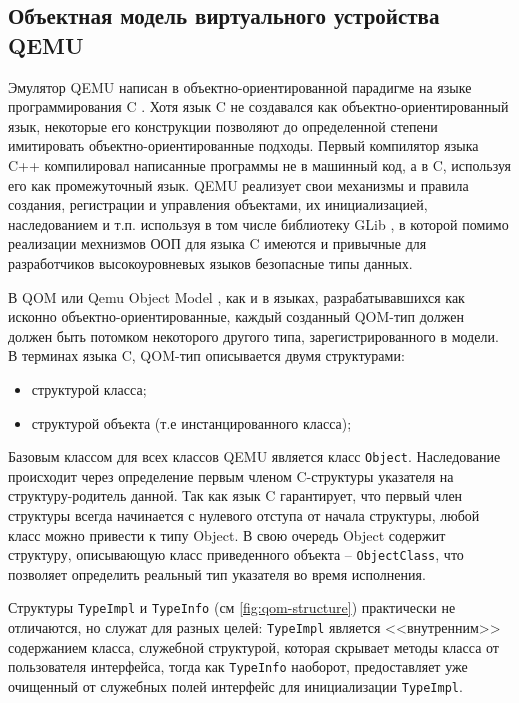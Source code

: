 \subsection{Объектная модель виртуального устройства QEMU}\label{sec:ch1/sec4/sub,/sub3}

Эмулятор QEMU написан в объектно-ориентированной парадигме на языке программирования C \cite{ooc}.
Хотя язык C не создавался как объектно-ориентированный язык, некоторые его конструкции позволяют
до определенной степени имитировать объектно-ориентированные подходы.
Первый компилятор языка C++ компилировал написанные программы не в машинный код, а в C, используя
его как промежуточный язык.
QEMU реализует свои механизмы и правила создания, регистрации и управления объектами, их инициализацией,
наследованием и т.п. используя в том числе библиотеку GLib \cite{glib}, в которой помимо реализации
мехнизмов ООП для языка C имеются и привычные для разработчиков высокоуровневых языков безопасные типы данных.

В QOM или Qemu Object Model \cite{qom-talking}, как и в языках, разрабатывавшихся как исконно объектно-ориентированные,
каждый созданный QOM-тип должен должен быть потомком некоторого другого типа, зарегистрированного в модели.
В терминах языка C, QOM-тип описывается двумя структурами:
\begin{itemize}
    \item структурой класса;
    \item структурой объекта (т.е инстанцированного класса);
\end{itemize}


Базовым классом для всех классов QEMU является класс \texttt{Object}.
Наследование происходит через определение первым членом C-структуры
указателя на структуру-родитель данной. Так как язык C гарантирует, что
первый член структуры всегда начинается с нулевого отступа от начала
структуры, любой класс можно привести к типу Object.
В свою очередь Object содержит структуру, описывающую класс приведенного
объекта -- \texttt{ObjectClass}, что позволяет определить реальный тип указателя
во время исполнения.

Структуры \texttt{TypeImpl} и \texttt{TypeInfo} (см \cref{fig:qom-structure}) практически не отличаются,
но служат для разных целей:
\texttt{TypeImpl} является <<внутренним>> содержанием класса, служебной структурой,
которая скрывает методы класса от пользователя интерфейса, тогда как \texttt{TypeInfo}
наоборот, предоставляет уже очищенный от служебных полей интерфейс для инициализации \texttt{TypeImpl}.

